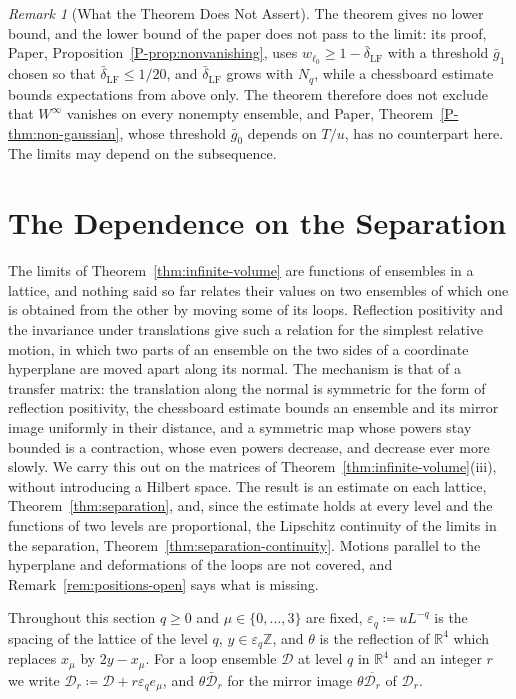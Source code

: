 \documentclass[11pt]{preprint}
\numberwithin{equation}{section}
\theoremstyle{definition}
\theoremstyle{remark}
\newtheorem{remark}[theorem]{Remark}
\theoremstyle{plain}
\begin{document}
\begin{remark}[What the Theorem Does Not Assert]\label{rem:not-asserted}
The theorem gives no lower bound, and the lower bound of the paper does not pass to the limit: its proof, Paper, Proposition~\ref{P-prop:nonvanishing}, uses $w_{\ell_0} \geq 1 - \bar\delta_{\mathrm{LF}}$ with a threshold $\bar g_1$ chosen so that $\bar\delta_{\mathrm{LF}} \leq 1/20$, and $\bar\delta_{\mathrm{LF}}$ grows with $N_q$, while a chessboard estimate bounds expectations from above only. The theorem therefore does not exclude that $W^\infty$ vanishes on every nonempty ensemble, and Paper, Theorem~\ref{P-thm:non-gaussian}, whose threshold $\bar g_0$ depends on $T/u$, has no counterpart here. The limits may depend on the subsequence.
\end{remark}

\section{The Dependence on the Separation}\label{sec:separation}

The limits of Theorem~\ref{thm:infinite-volume} are functions of ensembles in a lattice, and nothing said so far relates their values on two ensembles of which one is obtained from the other by moving some of its loops. Reflection positivity and the invariance under translations give such a relation for the simplest relative motion, in which two parts of an ensemble on the two sides of a coordinate hyperplane are moved apart along its normal. The mechanism is that of a transfer matrix: the translation along the normal is symmetric for the form of reflection positivity, the chessboard estimate bounds an ensemble and its mirror image uniformly in their distance, and a symmetric map whose powers stay bounded is a contraction, whose even powers decrease, and decrease ever more slowly. We carry this out on the matrices of Theorem~\ref{thm:infinite-volume}(iii), without introducing a Hilbert space. The result is an estimate on each lattice, Theorem~\ref{thm:separation}, and, since the estimate holds at every level and the functions of two levels are proportional, the Lipschitz continuity of the limits in the separation, Theorem~\ref{thm:separation-continuity}. Motions parallel to the hyperplane and deformations of the loops are not covered, and Remark~\ref{rem:positions-open} says what is missing.

Throughout this section $q \geq 0$ and $\mu \in \{ 0, \dots, 3 \}$ are fixed, $\varepsilon_q \coloneqq uL^{-q}$ is the spacing of the lattice of the level $q$, $y \in \varepsilon_q\mathbb Z$, and $\theta$ is the reflection of $\mathbb R^4$ which replaces $x_\mu$ by $2y - x_\mu$. For a loop ensemble $\mathcal D$ at level $q$ in $\mathbb R^4$ and an integer $r$ we write $\mathcal D_r \coloneqq \mathcal D + r\varepsilon_qe_\mu$, and $\theta\bar{\mathcal D}_r$ for the mirror image $\theta\overline{\mathcal D_r}$ of $\mathcal D_r$.
\end{document}
